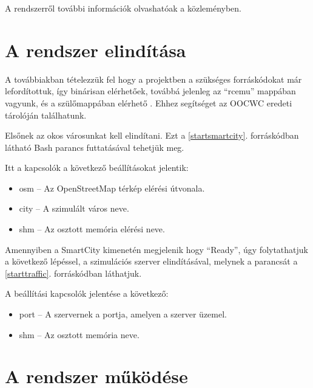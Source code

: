 \documentclass[a4paper,12pt]{report}
\begin{document}
\vspace{2mm}
A rendszerről további információk olvashatóak a \cite{infocomjournal} közleményben.

\section{A rendszer elindítása}
\label{howtostart}

A továbbiakban tételezzük fel hogy a projektben a szükséges forráskódokat már lefordítottuk, így binárisan elérhetőek, továbbá jelenleg az ``rcemu'' mappában vagyunk, és a szülőmappában elérhető . Ehhez segítséget az OOCWC eredeti tárolóján \cite{oocwcrepo} találhatunk.

\vspace{2mm}
Elsőnek az okos városunkat kell elindítani. Ezt a \ref{startsmartcity}. forráskódban látható Bash parancs futtatásával  tehetjük meg.



Itt a kapcsolók a következő beállításokat jelentik:

\begin{itemize}
\item osm -- Az OpenStreetMap térkép elérési útvonala.
\item city -- A szimulált város neve.
\item shm -- Az osztott memória elérési neve.
\end{itemize}

Amennyiben a SmartCity kimenetén megjelenik hogy ``Ready'', úgy folytathatjuk a következő lépéssel, a szimulációs szerver elindításával, melynek a parancsát a \ref{starttraffic}. forráskódban láthatjuk.



A beállítási kapcsolók jelentése a következő:

\begin{itemize}
\item port -- A szervernek a portja, amelyen a szerver üzemel.
\item shm -- Az osztott memória neve.
\end{itemize}

\section{A rendszer működése}
\end{document}
